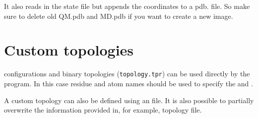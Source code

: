 It also reads in the state file but appends the coordinates to a pdb. file. So make sure to delete old QM.pdb and MD.pdb if you want to create a new image.


\section{Custom topologies}

\gromacs configurations and binary topologies (\texttt{topology.tpr}) can be used directly by the \ctpmap program. In this case residue and atom names should be used to specify the  and . 

A custom topology can also be defined using an \xml file. It is also possible to partially overwrite the information provided in, for example, \gromacs topology file. 

